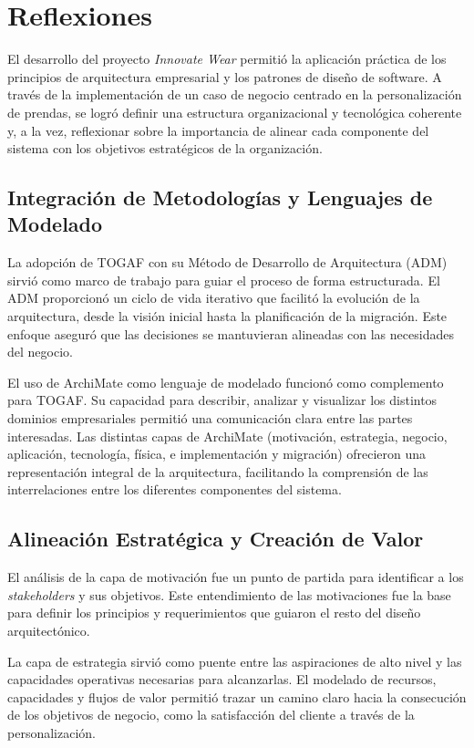 \section{Reflexiones}

El desarrollo del proyecto \textit{Innovate Wear} permitió la aplicación práctica de los principios de arquitectura empresarial y los patrones de diseño de software. A través de la implementación de un caso de negocio centrado en la personalización de prendas, se logró definir una estructura organizacional y tecnológica coherente y, a la vez, reflexionar sobre la importancia de alinear cada componente del sistema con los objetivos estratégicos de la organización.

\subsection{Integración de Metodologías y Lenguajes de Modelado}

La adopción de TOGAF con su Método de Desarrollo de Arquitectura (ADM) sirvió como marco de trabajo para guiar el proceso de forma estructurada. El ADM proporcionó un ciclo de vida iterativo que facilitó la evolución de la arquitectura, desde la visión inicial hasta la planificación de la migración. Este enfoque aseguró que las decisiones se mantuvieran alineadas con las necesidades del negocio.

El uso de ArchiMate como lenguaje de modelado funcionó como complemento para TOGAF. Su capacidad para describir, analizar y visualizar los distintos dominios empresariales permitió una comunicación clara entre las partes interesadas. Las distintas capas de ArchiMate (motivación, estrategia, negocio, aplicación, tecnología, física, e implementación y migración) ofrecieron una representación integral de la arquitectura, facilitando la comprensión de las interrelaciones entre los diferentes componentes del sistema.

\subsection{Alineación Estratégica y Creación de Valor}

El análisis de la capa de motivación fue un punto de partida para identificar a los \textit{stakeholders} y sus objetivos. Este entendimiento de las motivaciones fue la base para definir los principios y requerimientos que guiaron el resto del diseño arquitectónico.

La capa de estrategia sirvió como puente entre las aspiraciones de alto nivel y las capacidades operativas necesarias para alcanzarlas. El modelado de recursos, capacidades y flujos de valor permitió trazar un camino claro hacia la consecución de los objetivos de negocio, como la satisfacción del cliente a través de la personalización.

